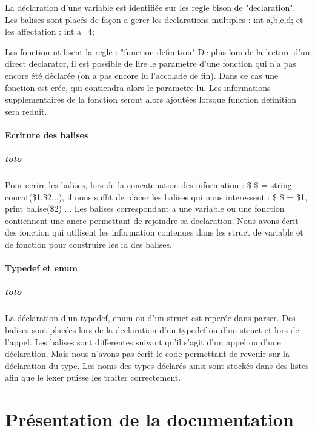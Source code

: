 \documentclass{report}
\begin{document}
{{{{			La déclaration d'une variable est identifiée sur les regle bison de "declaration". Les balises sont placés de façon a gerer les declarations multiples : int a,b,c,d;
			et les affectation : int a=4;
			
			Les fonction utilisent la regle : "function definition"
			De plus lors de la lecture d'un direct declarator, il est possible de lire le parametre d'une fonction qui n'a pas encore été déclarée (on a pas encore lu l'accolade de fin). Dans ce cas
			une fonction est crée, qui contiendra alors le parametre lu. Les informations supplementaires de la fonction seront alors ajoutées lorsque function definition sera reduit.
			}
			\subsubsection{Ecriture des balises}{
			\paragraph{toto}{
			Pour ecrire les balises, lors de la concatenation des information : \$ \$ = string concat(\$1,\$2,..), 
			il nous suffit de placer les balises qui nous interessent : \$ \$ = \$1, print balise(\$2) ...
			Les balises correspondant a une variable ou une fonction contiennent une ancre permettant de rejoindre sa declaration. Nous avons écrit des fonction qui utilisent les information
			contenues dans les struct de variable et de fonction pour construire les id des balises. 	
		}
		}
		\subsubsection{Typedef et enum}{
		\paragraph{toto}{
			La déclaration d'un typedef, enum ou d'un struct est reperée dans parser. Des balises sont placées lors de la declaration d'un typedef ou d'un struct et lors de l'appel. Les balises 
			sont differentes suivant qu'il s'agit d'un appel ou d'une déclaration. Mais nous n'avons pas écrit le code permettant de revenir sur la déclaration du type.
			Les noms des types déclarés ainsi sont stockés dans des listes afin que le lexer puisse les traiter correctement.
				
			}
			}
			}
			}
\chapter{Présentation de la documentation}
}
\end{document}
